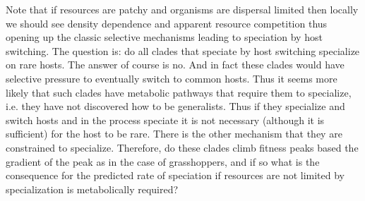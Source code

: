\documentclass[12pt]{article}
\begin{document}
Note that if resources are patchy and organisms are dispersal limited
then locally we should see density dependence and apparent resource
competition thus opening up the classic selective mechanisms leading
to speciation by host switching.  The question is: do all clades that
speciate by host switching specialize on rare hosts.  The answer of
course is no.  And in fact these clades would have selective pressure
to eventually switch to common hosts.  Thus it seems more likely that
such clades have metabolic pathways that require them to specialize,
i.e. they have not discovered how to be generalists.  Thus if they
specialize and switch hosts and in the process speciate it is not
necessary (although it is sufficient) for the host to be rare.  There
is the other mechanism that they are constrained to specialize.
Therefore, do these clades climb fitness peaks based the gradient of
the peak as in the case of grasshoppers, and if so what is the
consequence for the predicted rate of speciation if resources are not
limited by specialization is metabolically required?
\end{document}
